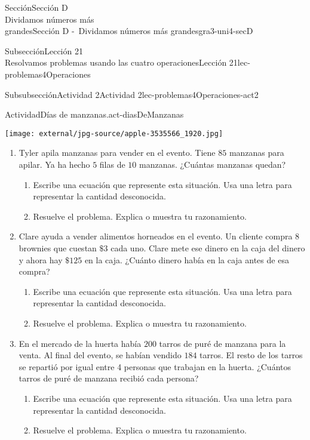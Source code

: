\begin{sectionptx}{Sección}{{\Large Sección D\\}Dividamos números más\\grandes}{}{Sección D -~Dividamos números más grandes}{}{}{gra3-uni4-secD}
\begin{subsectionptx}{Subsección}{{\normalsize Lección 21\\[-0.05cm]}Resolvamos problemas usando las cuatro operaciones}{}{Lección 21}{}{}{lec-problemas4Operaciones}
\begin{subsubsectionptx}{Subsubsección}{Actividad 2}{}{Actividad 2}{}{}{lec-problemas4Operaciones-act2}
\begin{activity}{Actividad}{Días de manzanas.}{act-diasDeManzanas}
\begin{sidebyside}{2}{0}{0.05}{0.05}
\begin{sbspanel}{0.3}
\texttt{[image: external/jpg-source/apple-3535566\_1920.jpg]}
\end{sbspanel}%
\end{sidebyside}%
\vspace{-0.3cm}
\begin{enumerate}
\item{}Tyler apila manzanas para vender en el evento. Tiene \(85\) manzanas para apilar. Ya ha hecho \(5\) filas de \(10\) manzanas. ¿Cuántas manzanas quedan?%
%
\begin{enumerate}
\item{}Escribe una ecuación que represente esta situación. Usa una letra para representar la cantidad desconocida.%
\item{}Resuelve el problema. Explica o muestra tu razonamiento.%
\end{enumerate}
\clearpage
\item{}Clare ayuda a vender alimentos horneados en el evento. Un cliente compra \(8\) brownies que cuestan \(\$3\) cada uno. Clare mete ese dinero en la caja del dinero y ahora hay \(\$125\) en la caja. ¿Cuánto dinero había en la caja antes de esa compra?%
%
\begin{enumerate}
\item{}Escribe una ecuación que represente esta situación. Usa una letra para representar la cantidad desconocida.%
\item{}Resuelve el problema. Explica o muestra tu razonamiento.%
\end{enumerate}
\item{}En el mercado de la huerta había \(200\) tarros de puré de manzana para la venta. Al final del evento, se habían vendido \(184\) tarros. El resto de los tarros se repartió por igual entre 4 personas que trabajan en la huerta. ¿Cuántos tarros de puré de manzana recibió cada persona?%
%
\begin{enumerate}
\item{}Escribe una ecuación que represente esta situación. Usa una letra para representar la cantidad desconocida.%
\item{}Resuelve el problema. Explica o muestra tu razonamiento.%
\end{enumerate}
\end{enumerate}
\end{activity}%
%
\end{subsubsectionptx}
\end{subsectionptx}

\end{sectionptx}

